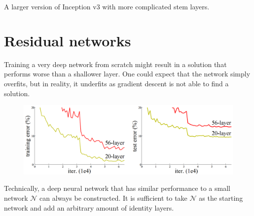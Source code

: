 A larger version of Inception v3 with more complicated stem layers.



\section{Residual networks}

\begin{remark}
    Training a very deep network from scratch might result in a solution that performs worse than a shallower layer.
    One could expect that the network simply overfits, but in reality, it underfits as gradient descent is not able to find a solution.

    \begin{figure}[H]
        \centering
        \includegraphics[width=0.5\linewidth]{./img/deep_network_error.png}
    \end{figure}
\end{remark}

\begin{remark}
    Technically, a deep neural network that has similar performance to a small network $\mathcal{N}$ can always be constructed.
    It is sufficient to take $\mathcal{N}$ as the starting network and add an arbitrary amount of identity layers.
\end{remark}

